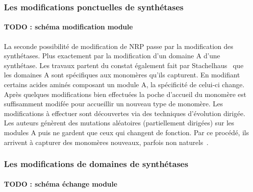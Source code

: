\documentclass[12pt,french,twoside]{report}
\begin{document}
\subsubsection{Les modifications ponctuelles de synthétases}

\paragraph{TODO : schéma modification module}

\paragraph{}La seconde possibilité de modification de NRP passe par la modification des synthétases.
Plus exactement par la modification d'un domaine A d'une synthétase.
Les travaux \cite{villiers_mapping_2009, kries_reprogramming_2014, williams_engineering_2013} partent du constat également fait par Stachelhaus~\cite{stachelhaus_specificity-conferring_1999} que les domaines A sont spécifiques aux monomères qu'ils capturent.
En modifiant certains acides aminés composant un module A, la spécificité de celui-ci change.
Après quelques modifications bien effectuées la poche d'accueil du monomère est suffisamment modifée pour accueillir un nouveau type de monomère.
Les modifications à effectuer sont découvertes via des techniques d'évolution dirigée.
Les auteurs génèrent des mutations aléatoires (partiellement dirigées) sur les modules A puis ne gardent que ceux qui changent de fonction.
Par ce procédé, ils arrivent à capturer des monomères nouveaux, parfois non naturels~\cite{thirlway_introduction_2012}.



\subsubsection{Les modifications de domaines de synthétases}

\paragraph{TODO : schéma échange module}
\end{document}
